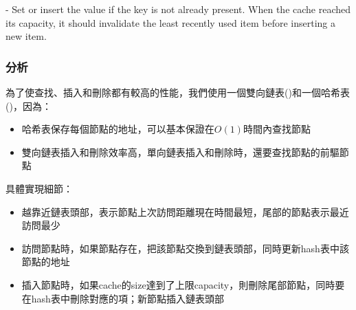  - Set or insert the value if the key is not already present. When the cache reached its capacity, it should invalidate the least recently used item before inserting a new item.


\subsubsection{分析}
為了使查找、插入和刪除都有較高的性能，我們使用一個雙向鏈表()和一個哈希表()，因為：
\begin{itemize}
\item{哈希表保存每個節點的地址，可以基本保證在$O(1)$時間內查找節點}
\item{雙向鏈表插入和刪除效率高，單向鏈表插入和刪除時，還要查找節點的前驅節點}
\end{itemize}

具體實現細節：
\begin{itemize}
\item{越靠近鏈表頭部，表示節點上次訪問距離現在時間最短，尾部的節點表示最近訪問最少}
\item{訪問節點時，如果節點存在，把該節點交換到鏈表頭部，同時更新hash表中該節點的地址}
\item{插入節點時，如果cache的size達到了上限capacity，則刪除尾部節點，同時要在hash表中刪除對應的項；新節點插入鏈表頭部}
\end{itemize}


